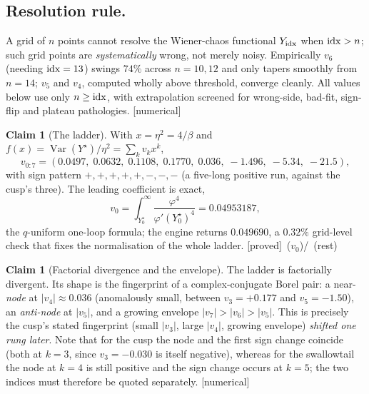 \documentclass[11pt,reqno]{amsart}
\theoremstyle{plain}
\theoremstyle{definition}
\newtheorem{claim}[theorem]{Claim}
\theoremstyle{remark}
\DeclareMathOperator{\Var}{Var}
\newcommand{\tagP}{{\footnotesize\textsf{[proved]}}}
\newcommand{\tagN}{{\footnotesize\textsf{[numerical]}}}
\begin{document}
\subsection{Resolution rule.}
A grid of $n$ points cannot resolve the Wiener-chaos functional $Y_{\rm idx}$ when ${\rm idx}>n$;
such grid points are \emph{systematically} wrong, not merely noisy. Empirically $v_6$ (needing
${\rm idx}=13$) swings $74\%$ across $n=10,12$ and only tapers smoothly from $n=14$; $v_5$ and
$v_4$, computed wholly above threshold, converge cleanly. All values below use only $n\ge{\rm idx}$,
with extrapolation screened for wrong-side, bad-fit, sign-flip and plateau pathologies. \tagN

\begin{claim}[The ladder]\label{claim:ladder}
With $x=\eta^2=4/\beta$ and $f(x)=\Var(Y^\star)/\eta^2=\sum_k v_kx^k$,
\begin{equation}\label{eq:coeffs}
v_{0:7}=(0.0497,\;0.0632,\;0.1108,\;0.1770,\;0.036,\;-1.496,\;-5.34,\;-21.5),
\end{equation}
with sign pattern $+,+,+,+,+,-,-,-$ (a five-long positive run, against the cusp's three). The
leading coefficient is exact,
\begin{equation}\label{eq:v0}
v_0=\int_{Y^\star_0}^{\infty}\frac{\varphi^4}{\varphi'(Y^\star_0)^4}=0.04953187,
\end{equation}
the $q$-uniform one-loop formula; the engine returns $0.049690$, a $0.32\%$ grid-level check that
fixes the normalisation of the whole ladder. \tagP\ ($v_0$)\;/\;\tagN\ (rest)
\end{claim}

\begin{claim}[Factorial divergence and the envelope]\label{claim:divergence}
The ladder is factorially divergent. Its shape is the fingerprint of a complex-conjugate Borel
pair: a near-\emph{node} at $|v_4|\approx0.036$ (anomalously small, between $v_3=+0.177$ and
$v_5=-1.50$), an \emph{anti-node} at $|v_5|$, and a growing envelope
$|v_7|>|v_6|>|v_5|$. This is precisely the cusp's stated fingerprint (small $|v_3|$, large $|v_4|$,
growing envelope) \emph{shifted one rung later}. Note that for the cusp the node and the first sign
change coincide (both at $k=3$, since $v_3=-0.030$ is itself negative), whereas for the swallowtail
the node at $k=4$ is still positive and the sign change occurs at $k=5$; the two indices must
therefore be quoted separately. \tagN
\end{claim}
\end{document}
